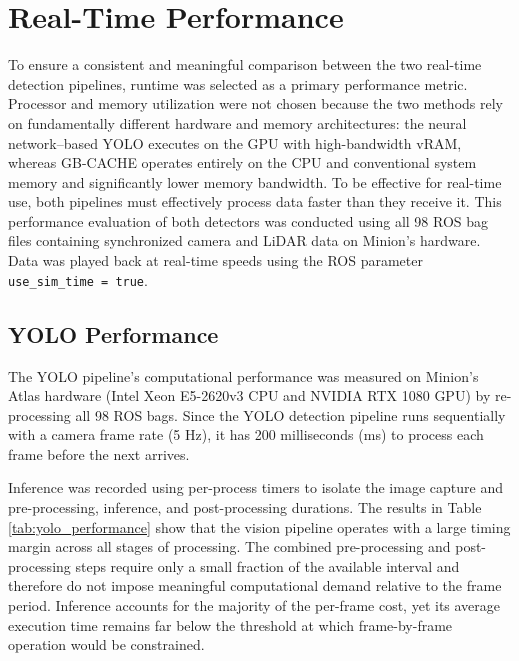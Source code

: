 \documentclass{erauthesis}
\begin{document}

\section{Real-Time Performance}

To ensure a consistent and meaningful comparison between the two real-time detection pipelines, runtime was selected as a primary performance metric. 
Processor and memory utilization were not chosen because the two methods rely on fundamentally different hardware and memory architectures: the neural network–based YOLO executes on the \ac{GPU} with high-bandwidth \ac{vRAM}, whereas GB-CACHE operates entirely on the \ac{CPU} and conventional system memory and significantly lower memory bandwidth.
To be effective for real-time use, both pipelines must effectively process data faster than they receive it.
This performance evaluation of both detectors was conducted using all 98 ROS bag files containing synchronized camera and LiDAR data on Minion's hardware. Data was played back at real-time speeds using the ROS parameter \texttt{use\_sim\_time = true}.

\subsection{YOLO Performance}
The YOLO pipeline’s computational performance was measured on Minion's Atlas hardware (Intel Xeon E5-2620v3 \ac{CPU} and NVIDIA RTX 1080 \ac{GPU}) by re-processing all 98 ROS bags.
Since the YOLO detection pipeline runs sequentially with a camera frame rate (5 Hz), it has 200 milliseconds (ms) to process each frame before the next arrives. 

Inference was recorded using per-process timers to isolate the image capture and pre-processing, inference, and post-processing durations.
The results in Table \ref{tab:yolo_performance} show that the vision pipeline operates with a large timing margin across all stages of processing. 
The combined pre-processing and post-processing steps require only a small fraction of the available interval and therefore do not impose meaningful computational demand relative to the frame period.
Inference accounts for the majority of the per-frame cost, yet its average execution time remains far below the threshold at which frame-by-frame operation would be constrained.
\end{document}
